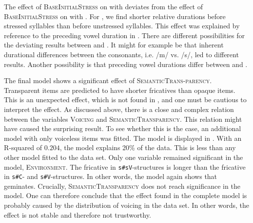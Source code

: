 The effect of \textsc{BaseInitialStress} on  with  deviates from the effect of \textsc{BaseInitialStress} on  with . For , we find shorter relative durations before stressed syllables than before unstressed syllables. This effect was explained by reference to the preceding vowel duration in . There are different possibilities for the deviating results between  and . It might for example be that inherent durational differences between the consonants, i.e. /m/ vs. /s/, led to different results. Another possibility is that preceding vowel durations differ between  and .
          

 The final  model shows a significant effect of \textsc{SemanticTrans-parency}. Transparent items are predicted to have shorter fricatives than opaque items. This is an unexpected effect, which is not found in , and one must be cautious to interpret the effect. 
 As discussed above, there is a close and complex relation between the variables \textsc{Voicing} and \textsc{SemanticTransparency}. This relation might have caused the surprising result. To see whether this is the case, an additional model with only voiceless items was fitted. The model is displayed in .
 With an R-squared of $0.204$, the model explains 20\% of the data. This is less than any other model fitted to the data set. Only one variable remained significant in the model, \textsc{Environment}. The fricative in \texttt{s\#sV}-structures is longer than the fricative in \texttt{s\#C}- and \texttt{s\#V}-structures. In other words, the model again shows that  geminates. 
 Crucially, \textsc{SemanticTransparency} does not reach significance in the model. One can therefore conclude that the effect found in the complete model is probably caused by the distribution of voicing in the data set. In other words, the effect is not stable and therefore not trustworthy.

